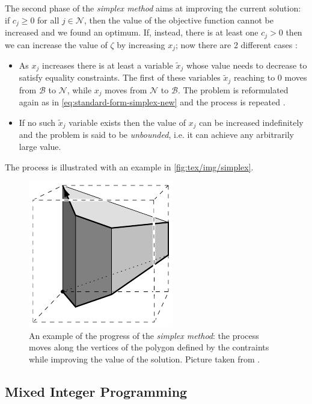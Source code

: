 The second phase of the \emph{simplex method} aims at improving the current
solution: if $c_{j} \geq 0$ for all $j \in \mathcal{N} $, then the value of the
objective function cannot be increased and we found an optimum. If, instead,
there is at least one $c_{j}
	> 0$ then we can increase the value of $\zeta$ by increasing $x_{j} $; now
there are 2 different cases \cite{Vanderbei2008}:
\begin{itemize}
	\item As $x_{j} $ increases there is at least a variable $\tilde{x}_{j} $
	      whose value needs to decrease to satisfy equality constraints. The first
	      of these variables $\tilde{x}_{j} $ reaching to $0$ moves from
	      $\mathcal{B} $ to $\mathcal{N} $, while
	      $x_{j} $ moves from $\mathcal{N} $ to $\mathcal{B} $. The problem is reformulated again as in
	      \autoref{eq:standard-form-simplex-new} and the process is repeated
	      \cite{Vanderbei2008}.
	\item If no such $\tilde{x}_{j} $ variable exists then the value of $x_{j}
	      $ can be increased indefinitely and the problem is said to be
	      \emph{unbounded}, i.e. it can achieve any arbitrarily large value.
\end{itemize}

The process is illustrated with an example in \autoref{fig:tex/img/simplex}.

\begin{figure}
	\centering
	\includegraphics[width=0.4\linewidth]{tex/img/simplex.png}
	\caption[Simplex method progress]{An example of the progress of the \emph{simplex method}: the
		process moves along the vertices of the polygon defined by the
		contraints while improving the value of the solution. Picture taken
		from \cite{BerndGaertner2006}.}%
	\label{fig:tex/img/simplex}
\end{figure}

\subsection{Mixed Integer Programming}%
\label{sub:mixed_integer_programming}

